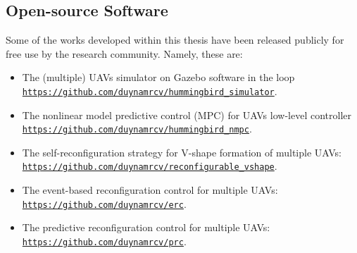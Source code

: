 \subsection{Open-source Software}\label{sec23}
Some of the works developed within this thesis have been released publicly for free use by the research community. Namely, these are:
\begin{itemize}
    \item The (multiple) UAVs simulator on Gazebo software in the loop {\tt\url{https://github.com/duynamrcv/hummingbird_simulator}}.
        \item The nonlinear model predictive control (MPC) for UAVs low-level controller {\tt\url{https://github.com/duynamrcv/hummingbird_nmpc}}.
    \item The self-reconfiguration strategy for V-shape formation of multiple UAVs: {\tt\url{https://github.com/duynamrcv/reconfigurable_vshape}}.
        \item The event-based reconfiguration control for multiple UAVs: {\tt\url{https://github.com/duynamrcv/erc}}.
    \item The predictive reconfiguration control for multiple UAVs: {\tt\url{https://github.com/duynamrcv/prc}}.
\end{itemize}

